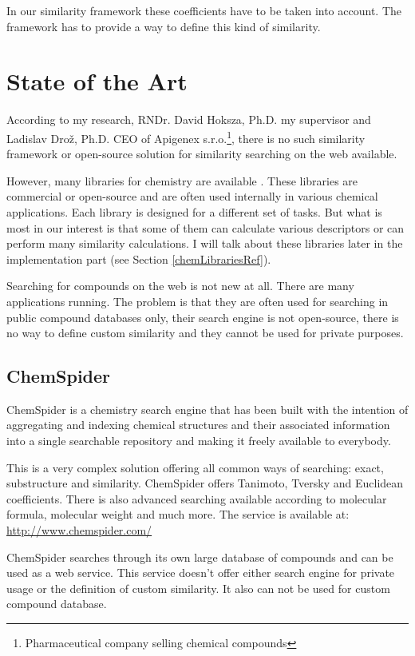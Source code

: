 \documentclass[thesis=M,english]{FITthesis}[2012/10/20]
\begin{document}
In our similarity framework these coefficients have to be taken into account. The framework has to provide a way to define this kind of similarity.


\section{State of the Art}
According to my research, RNDr. David Hoksza, Ph.D. my supervisor and Ladislav Drož, Ph.D. CEO of Apigenex s.r.o.\footnote{ Pharmaceutical company selling chemical compounds}, there is no such similarity framework or open-source solution for similarity searching on the web available.

However, many libraries for chemistry are available . These libraries are commercial or open-source and are often used internally in various chemical applications. Each library is designed for a different set of tasks. But what is most in our interest is that some of them can calculate various descriptors or can perform many similarity calculations. I will talk about these libraries later in the implementation part (see Section \ref{chemLibrariesRef}).

Searching for compounds on the web is not new at all. There are many applications running. The problem is that they are often used for searching in public compound databases only, their search engine is not open-source, there is no way to define custom similarity and they cannot be used for private purposes. 

\subsection{ChemSpider}
ChemSpider is a chemistry search engine that has been built with the intention of aggregating and indexing chemical structures and their associated information into a single searchable repository and making it freely available to everybody.\cite{taverna}

This is a very complex solution offering all common ways of searching: exact, substructure and similarity. ChemSpider offers Tanimoto, Tversky and Euclidean coefficients. There is also advanced searching available according to molecular formula, molecular weight and much more. The service is available at: \url{http://www.chemspider.com/}

ChemSpider searches through its own large database of compounds and can be used as a web service.
This service doesn’t offer either search engine for private usage or the definition of custom similarity.  It also can not be used for custom compound database.
\end{document}
